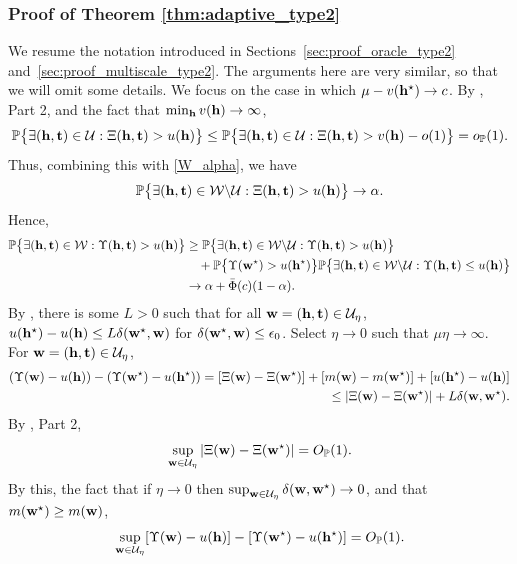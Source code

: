 \documentclass[twoside,11pt]{article}
\begin{document}
\subsubsection{Proof of Theorem \ref{thm:adaptive_type2}}
We resume the notation introduced in Sections~\ref{sec:proof_oracle_type2} and~\ref{sec:proof_multiscale_type2}.  The arguments here are very similar, so that we will omit some details.
We focus on the case in which $\mu - v(\mathbf{h}^\star) \rightarrow c$.
By , Part 2, and the fact that $\min_{\mathbf{h}} v(\mathbf{h}) \to \infty$,
\[
\mathbb{P}\big\{\exists (\mathbf{h},\mathbf{t}) \in \mathcal{U} : \Xi(\mathbf{h},\mathbf{t}) > u(\mathbf{h})\big\} \le \mathbb{P}\big\{\exists (\mathbf{h},\mathbf{t}) \in \mathcal{U} : \Xi(\mathbf{h},\mathbf{t}) > v(\mathbf{h}) - o(1) \big\} = o_{\mathbb{P}}(1).
\]
Thus, combining this with \eqref{W_alpha}, we have
\[
\begin{aligned}
\mathbb{P}\big\{\exists (\mathbf{h},\mathbf{t}) \in \mathcal{W} \backslash \mathcal{U} :  \Xi(\mathbf{h},\mathbf{t}) > u(\mathbf{h})\big\} \rightarrow \alpha.
\end{aligned}
\]
Hence,
\[
\begin{aligned}
\mathbb{P} \big\{\exists (\mathbf{h},\mathbf{t}) \in \mathcal{W} :  \Upsilon(\mathbf{h},\mathbf{t}) > u(\mathbf{h}) \big\} 
&\ge \mathbb{P} \big\{\exists (\mathbf{h},\mathbf{t}) \in \mathcal{W} \backslash \mathcal{U} :\Upsilon(\mathbf{h},\mathbf{t}) > u(\mathbf{h}) \big\} \\
&\quad + \mathbb{P} \big\{ \Upsilon(\mathbf{w}^\star) > u(\mathbf{h}^\star)\big\} \mathbb{P} \big\{ \exists (\mathbf{h},\mathbf{t}) \in \mathcal{W} \backslash \mathcal{U} : \Upsilon(\mathbf{h},\mathbf{t}) \le u(\mathbf{h}) \big\}\\
&\rightarrow \alpha + \bar \Phi(c) (1 - \alpha). 
\end{aligned}
\]
By , there is some $L > 0$ such that for all $\mathbf{w} = (\mathbf{h},\mathbf{t}) \in \mathcal{U}_\eta$, $u(\mathbf{h}^\star) - u(\mathbf{h}) \le L \delta(\mathbf{w}^\star,\mathbf{w})$ for $\delta(\mathbf{w}^\star,\mathbf{w}) \le \epsilon_0$.
Select $\eta\rightarrow 0$ such that $\mu \eta \rightarrow \infty$.
For $\mathbf{w} = (\mathbf{h},\mathbf{t}) \in \mathcal{U}_\eta$,
\[
\begin{aligned}
( \Upsilon(\mathbf{w}) - u(\mathbf{h}) ) - ( \Upsilon(\mathbf{w}^\star) - u(\mathbf{h}^\star) ) = [\Xi(\mathbf{w}) - \Xi(\mathbf{w}^\star)] + [m(\mathbf{w}) - m(\mathbf{w}^\star)] + [u(\mathbf{h}^\star) - u(\mathbf{h})] \\
\le |\Xi(\mathbf{w}) - \Xi(\mathbf{w}^\star)| + L \delta(\mathbf{w},\mathbf{w}^\star).
\end{aligned}
\]
By , Part 2, 
\[
\sup_{\mathbf{w} \in \mathcal{U}_\eta} |\Xi(\mathbf{w}) - \Xi(\mathbf{w}^\star)| = O_{\mathbb{P}}(1).
\]
By this, the fact that if $\eta \rightarrow 0$ then $\sup_{\mathbf{w} \in \mathcal{U}_\eta}\delta(\mathbf{w},\mathbf{w}^\star) \rightarrow 0$, and that $m(\mathbf{w}^\star) \ge m(\mathbf{w})$,
\[
\sup_{\mathbf{w} \in \mathcal{U}_\eta} [\Upsilon(\mathbf{w}) - u(\mathbf{h})] - [\Upsilon(\mathbf{w}^\star) - u(\mathbf{h}^\star)] = O_{\mathbb{P}}(1).
\]
\end{document}
